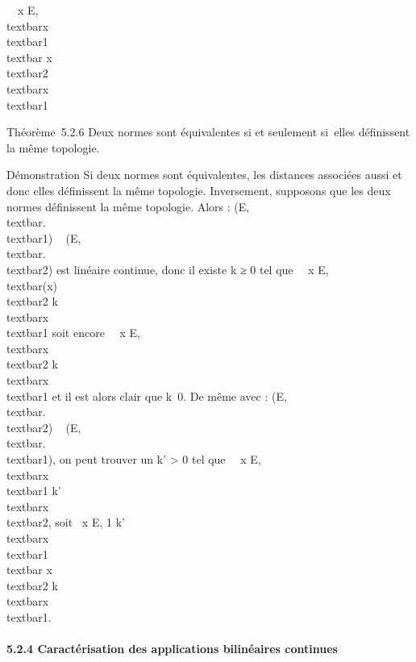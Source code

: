 \forall~~x \in E,\quad
\alpha~\\textbar{}x\\textbar{}1
\leq\\textbar{} x\\textbar{}2 \leq
\beta~\\textbar{}x\\textbar{}1

Théorème~5.2.6 Deux normes sont équivalentes si et seulement si~elles
définissent la même topologie.

Démonstration Si deux normes sont équivalentes, les distances associées
aussi et donc elles définissent la même topologie. Inversement,
supposons que les deux normes définissent la même topologie. Alors
\mathrmIdE :
(E,\\textbar{}.\\textbar{}1) \rightarrow~
(E,\\textbar{}.\\textbar{}2) est
linéaire continue, donc il existe k ≥ 0 tel que
\forall~~x \in E,
\\textbar{}\mathrmIdE(x)\\textbar{}2
\leq k\\textbar{}x\\textbar{}1 soit
encore \forall~~x \in E,
\\textbar{}x\\textbar{}2 \leq
k\\textbar{}x\\textbar{}1 et il
est alors clair que k\neq~0. De même avec
\mathrmIdE :
(E,\\textbar{}.\\textbar{}2) \rightarrow~
(E,\\textbar{}.\\textbar{}1), on
peut trouver un k' \textgreater{} 0 tel que \forall~~x
\in E, \\textbar{}x\\textbar{}1 \leq
k'\\textbar{}x\\textbar{}2, soit
\forall~x \in E, 1 \over k'~
\\textbar{}x\\textbar{}1
\leq\\textbar{} x\\textbar{}2 \leq
k\\textbar{}x\\textbar{}1.

\paragraph{5.2.4 Caractérisation des applications bilinéaires continues}

